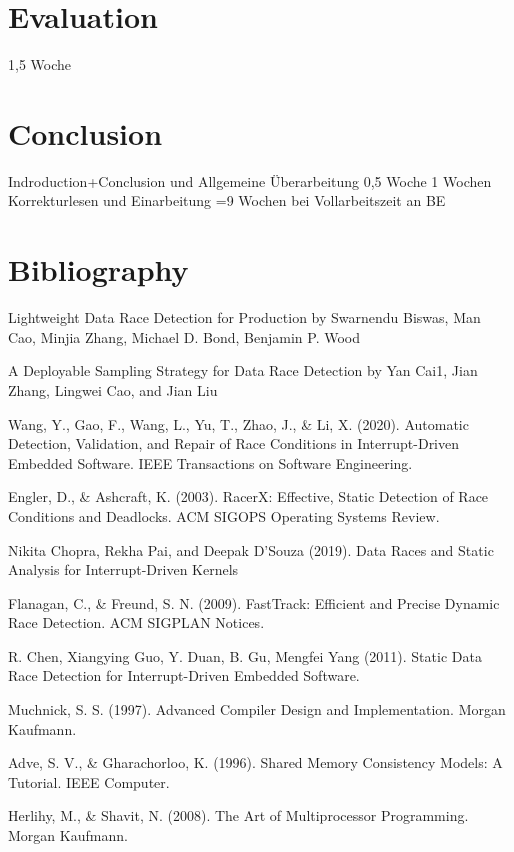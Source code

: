 \documentclass[
fancyheadings, %
%
%
]{stsreprt}
\begin{document}
{		
		\chapter{Evaluation}
		1,5 Woche 
		\chapter{Conclusion}
		Indroduction+Conclusion und Allgemeine Überarbeitung 0,5 Woche
		1 Wochen Korrekturlesen und Einarbeitung
		=9 Wochen bei Vollarbeitszeit an BE
		\appendix
	}
	\backmatter{}
	\chapter{Bibliography}
	Lightweight Data Race Detection for Production by Swarnendu Biswas, Man Cao, Minjia Zhang, Michael D. Bond, Benjamin P. Wood
	
	
	A Deployable Sampling Strategy for Data Race Detection by Yan Cai1, Jian Zhang, Lingwei Cao, and Jian Liu
	\begin{thebibliography}{9}
		Wang, Y., Gao, F., Wang, L., Yu, T., Zhao, J., \& Li, X. (2020). Automatic Detection, Validation, and Repair of Race Conditions in Interrupt-Driven Embedded Software. IEEE Transactions on Software Engineering.
		
		Engler, D., \& Ashcraft, K. (2003). RacerX: Effective, Static Detection of Race Conditions and Deadlocks. ACM SIGOPS Operating Systems Review.
		
		Nikita Chopra, Rekha Pai, and Deepak D’Souza (2019). Data Races and Static Analysis for Interrupt-Driven Kernels
		
		Flanagan, C., \& Freund, S. N. (2009). FastTrack: Efficient and Precise Dynamic Race Detection. ACM SIGPLAN Notices.
		
		R. Chen, Xiangying Guo, Y. Duan, B. Gu, Mengfei Yang (2011). Static Data Race Detection for Interrupt-Driven Embedded Software.
		
		Muchnick, S. S. (1997). Advanced Compiler Design and Implementation. Morgan Kaufmann.
		
		Adve, S. V., \& Gharachorloo, K. (1996). Shared Memory Consistency Models: A Tutorial. IEEE Computer.
		
		Herlihy, M., \& Shavit, N. (2008). The Art of Multiprocessor Programming. Morgan Kaufmann.
	\end{thebibliography}
\end{document}
